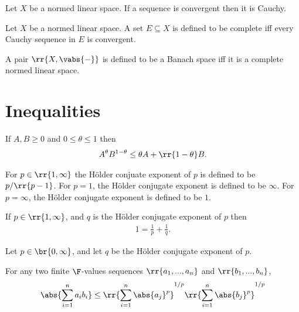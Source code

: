 \documentclass{article}
\begin{document}
\begin{theorem}
  \label{thm:convergent-implies-cauchy}
  Let $X$ be a normed linear space. If a sequence is convergent then it is Cauchy.
\end{theorem}


\begin{definition}
  \label{def:complete}
  Let $X$ be a normed linear space. A set $E\subseteq X$ is defined to be complete iff every Cauchy
  sequence in $E$ is convergent.
\end{definition}


\begin{definition}
  \label{def:banach}
  A pair $ \rr{ X, \vabs{ - } } $ is defined to be a Banach space iff it is a complete normed linear space.
\end{definition}


\section{Inequalities}
\label{sec:ineqaulities}


\begin{theorem}
  \label{thm:gagm}
  If $A,B\geq 0$ and $0\leq\theta\leq 1$ then
  \begin{align*}
    A^\theta B^{1-\theta} \leq \theta A + \rr{ 1-\theta }B.
  \end{align*}
\end{theorem}

\begin{definition}
  \label{def:holder-conjugate-exponent}
  For $p\in \rr{ 1,\infty }$ the H\"older conjuate exponent of $p$ is defined to be $p/ \rr{ p-1 }$.
  For $p=1$, the H\"older conjugate exponent is defined to be $\infty$. For $p=\infty$, the
  H\"older conjugate exponent is defined to be $1$.
\end{definition}

\begin{theorem}
  \label{thm:hce-equals-one}
  If $p\in \rr{ 1,\infty }$, and $q$ is the H\"older conjugate exponent of $p$ then
  \begin{align*}
    1 = \frac{1}{p} + \frac{1}{q}.
  \end{align*}
\end{theorem}


\begin{theorem}
  \label{thm:holder-inequality-finite}
  Let $p\in \br{ 0,\infty }$, and let $q$ be the H\"older conjugate exponent of $p$.

  For any two finite $\F$-values sequences $ \rr{ a_1, ..., a_n }$ and $ \rr{ b_1, ..., b_n }$,
  \begin{align*}
    \abs{\sum_{i=1}^n a_i b_i}
    \leq \rr{ \sum_{i=1}^n \abs{a_j}^p }^{1/p} \rr{ \sum_{i=1}^n \abs{b_j}^p }^{1/p}
  \end{align*}
\end{theorem}
\end{document}
